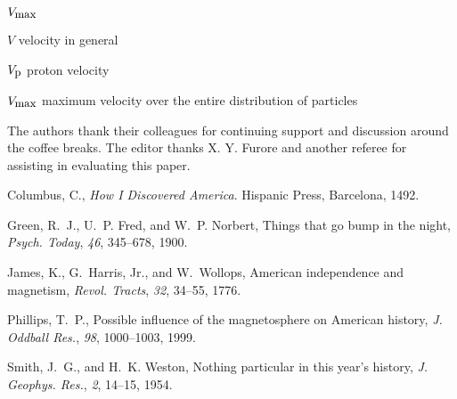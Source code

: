 \documentclass[jgrga]{aguplus}                     %
\begin{document}
\begin{article}
\begin{notation}{$V_{\mbox{\small max}}$}
  \item[$V$]  velocity in general
  \item[$V_{\mbox{\small p}}$]
              proton velocity
  \item[$V_{\mbox{\small max}}$]
              maximum velocity over the entire distribution of particles
\end{notation}

\acknowledgments %
The authors thank their colleagues for continuing support and discussion
around the coffee breaks. The editor thanks X. Y. Furore and another referee
for assisting in evaluating this paper.

\begin{thebibliography}{}    %

Columbus, C., {\it How {I} Discovered {America}}. Hispanic Press, Barcelona,
  1492.

Green, R.~J., U.~P. Fred, and W.~P. Norbert, Things that go bump in the night,
  {\it Psych. Today}, {\it 46}, 345--678, 1900.

James, K., G.~Harris, Jr., and W.~Wollops, {American} independence and
  magnetism, {\it Revol. Tracts}, {\it 32}, 34--55, 1776.

Phillips, T.~P., Possible influence of the magnetosphere on {American} history,
  {\it J. Oddball Res.}, {\it 98}, 1000--1003, 1999.

Smith, J.~G., and H.~K. Weston, Nothing particular in this year's history, {\it
  J. Geophys. Res.}, {\it 2}, 14--15, 1954.

\end{thebibliography}

\end{article} %
\end{document}
